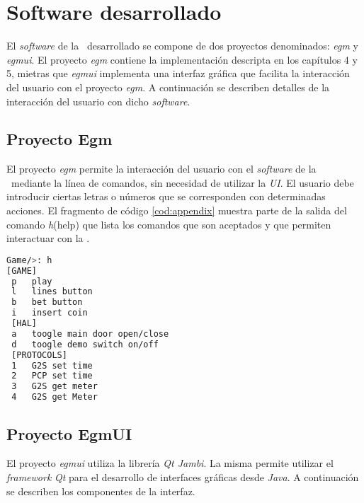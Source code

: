 \ifx\all\undefined


\fi

\chapter{Software desarrollado}

El \textit{software} de la \sm~desarrollado se compone de dos proyectos denominados: \textit{egm} y \textit{egmui}. El proyecto \textit{egm} contiene la implementaci\'on descripta en los cap\'itulos 4 y 5,
mietras que \textit{egmui} implementa una interfaz gr\'afica que facilita la interacci\'on del usuario con el proyecto \textit{egm}. A continuaci\'on se describen detalles de la interacci\'on del usuario
con dicho \textit{software}.

\section{Proyecto Egm}
El proyecto \textit{egm} permite la interacci\'on del usuario con el \textit{software} de la \sm~mediante la l\'inea de comandos, sin necesidad de utilizar la \textit{UI}.
El usuario debe introducir ciertas letras o n\'umeros que se corresponden con determinadas acciones.
El fragmento de c\'odigo \ref{cod:appendix} muestra parte de la salida del comando \textit{h}(help) que lista los comandos que son aceptados y que permiten interactuar con la \sm.

\begin{lstlisting}[language=sh,numbers=none,label=cod:appendix,caption={Lista de comando aceptados por la \sm~en modo consola.}]
Game/>: h
[GAME]
 p 	 play 
 l 	 lines button
 b 	 bet button
 i 	 insert coin
 [HAL] 
 a 	 toogle main door open/close
 d 	 toogle demo switch on/off
 [PROTOCOLS]
 1 	 G2S set time
 2 	 PCP set time
 3 	 G2S get meter
 4 	 G2S get Meter

\end{lstlisting}
% 

\section{Proyecto EgmUI}

El proyecto \textit{egmui} utiliza la librer\'ia \textit{Qt Jambi}\cite{qtjambi}. La misma permite utilizar el \textit{framework}
\textit{Qt} para el desarrollo de interfaces gr\'aficas desde \textit{Java}. A continuaci\'on se describen los componentes de la interfaz.

